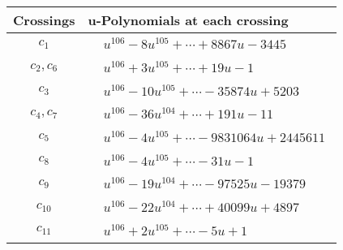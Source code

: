 \documentclass[1p]{elsarticle_modified}
\theoremstyle{definition}
\begin{document}
\begin{tabular}{m{50pt}|m{274pt}}
Crossings & \hspace{64pt}u-Polynomials at each crossing \\
\hline $$\begin{aligned}c_{1}\end{aligned}$$&$\begin{aligned}
&u^{106}-8 u^{105}+\cdots+8867 u-3445
\end{aligned}$\\
\hline $$\begin{aligned}c_{2},c_{6}\end{aligned}$$&$\begin{aligned}
&u^{106}+3 u^{105}+\cdots+19 u-1
\end{aligned}$\\
\hline $$\begin{aligned}c_{3}\end{aligned}$$&$\begin{aligned}
&u^{106}-10 u^{105}+\cdots-35874 u+5203
\end{aligned}$\\
\hline $$\begin{aligned}c_{4},c_{7}\end{aligned}$$&$\begin{aligned}
&u^{106}-36 u^{104}+\cdots+191 u-11
\end{aligned}$\\
\hline $$\begin{aligned}c_{5}\end{aligned}$$&$\begin{aligned}
&u^{106}-4 u^{105}+\cdots-9831064 u+2445611
\end{aligned}$\\
\hline $$\begin{aligned}c_{8}\end{aligned}$$&$\begin{aligned}
&u^{106}-4 u^{105}+\cdots-31 u-1
\end{aligned}$\\
\hline $$\begin{aligned}c_{9}\end{aligned}$$&$\begin{aligned}
&u^{106}-19 u^{104}+\cdots-97525 u-19379
\end{aligned}$\\
\hline $$\begin{aligned}c_{10}\end{aligned}$$&$\begin{aligned}
&u^{106}-22 u^{104}+\cdots+40099 u+4897
\end{aligned}$\\
\hline $$\begin{aligned}c_{11}\end{aligned}$$&$\begin{aligned}
&u^{106}+2 u^{105}+\cdots-5 u+1
\end{aligned}$\\
\hline
\end{tabular}\\~\\
\end{document}
